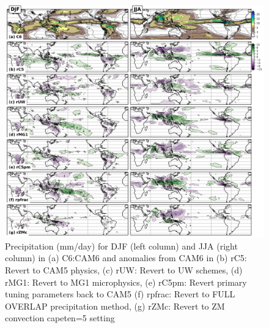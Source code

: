 \clearpage
\begin{figure}[t]
  \begin{center}
    \includegraphics[width=1.1\textwidth,angle=0.]{./figs/f_revert_PRECT_2D.png}
  \end{center}
  \caption{Precipitation (mm/day) for DJF (left column) and JJA (right column) in (a) C6:CAM6 and anomalies from CAM6 in (b) rC5: Revert to CAM5 physics, (c) rUW: Revert to UW schemes, (d) rMG1: Revert to MG1 microphysics, (e) rC5pm: Revert primary tuning parameters back to CAM5 (f) rpfrac: Revert to FULL OVERLAP precipitation method, (g) rZMc: Revert to ZM convection capeten=5 setting}   
\label{f_revert_PRECT_2D}
\end{figure} 

